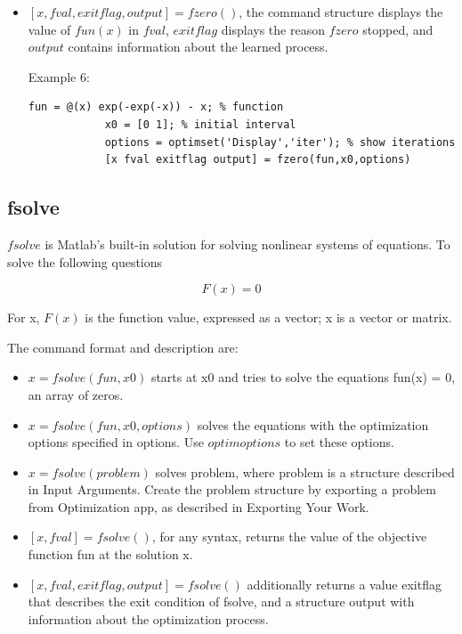\documentclass[10pt,math=newtx,citestyle=gb7714-2015,bibstyle=gb7714-2015]{elegantbook}
\begin{document}
{{{\begin{itemize}
		$x=1.8115$
		
		\item $[x,fval,exitflag,output] = fzero()$, the command structure displays the value of $fun(x)$ in $fval$, $exitflag$ displays the reason $fzero$ stopped, and $output$ contains information about the learned process.
		
		Example 6: 
		
		\begin{lstlisting}[frame=shadowbox]
			fun = @(x) exp(-exp(-x)) - x; % function
			x0 = [0 1]; % initial interval
			options = optimset('Display','iter'); % show iterations
			[x fval exitflag output] = fzero(fun,x0,options)
		\end{lstlisting}
	\end{itemize}
	
	\subsection{fsolve}
	
	$fsolve$ is Matlab's built-in solution for solving nonlinear systems of equations. To solve the following questions
	
	$$F(x)=0$$
	
	For x, $F(x)$ is the function value, expressed as a vector; x is a vector or matrix.
	
	The command format and description are:
	
	\begin{itemize}
		\item $x = fsolve(fun,x0)$ starts at x0 and tries to solve the equations fun(x) = 0, an array of zeros.
		\item $x = fsolve(fun,x0,options)$ solves the equations with the optimization options specified in options. Use $optimoptions$ to set these options.
		
		\item $x = fsolve(problem)$ solves problem, where problem is a structure described in Input Arguments. Create the problem structure by exporting a problem from Optimization app, as described in Exporting Your Work.
		
		\item $[x,fval] = fsolve()$, for any syntax, returns the value of the objective function fun at the solution x.
		
		
		\item $[x,fval,exitflag,output] = fsolve()$ additionally returns a value exitflag that describes the exit condition of fsolve, and a structure output with information about the optimization process.
		

\end{itemize}}}}
\end{document}

